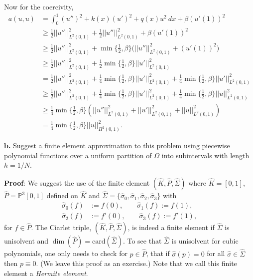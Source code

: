 \documentclass[11pt]{article}
\newcommand{\wh}{\widehat}
\begin{document}
Now for the coercivity, 
\begin{align*}
    a(u,u) &= \int_0^1 (u'')^2 + k(x) (u')^2 + q(x) u^2 \: dx + \beta (u'(1))^2 \\
    &\geq \tfrac{1}{2} ||u''||^2_{L^2(0,1)} + \tfrac{1}{2} ||u''||^2_{L^2(0,1)} + \beta (u'(1))^2 \\
    &\geq \tfrac{1}{2} ||u''||^2_{L^2(0,1)} + \min\big\{ \tfrac{1}{2}, \beta \big\} \big(||u''||^2_{L^2(0,1)} + (u'(1))^2\big) \\
    &\geq \frac{1}{2}||u''||^2_{L^2(0,1)} + \frac{1}{2}\min\Big\{\frac{1}{2}, \beta \Big\} ||u'||^2_{L^2(0,1)} \\
    &= \frac{1}{2}||u''||^2_{L^2(0,1)} + \frac{1}{4}\min\Big\{\frac{1}{2}, \beta \Big\} ||u'||^2_{L^2(0,1)} + \frac{1}{4}\min\Big\{\frac{1}{2}, \beta \Big\} ||u'||^2_{L^2(0,1)} \\
    &\geq \frac{1}{2}||u''||^2_{L^2(0,1)} + \frac{1}{4}\min\Big\{\frac{1}{2}, \beta \Big\} ||u'||^2_{L^2(0,1)} + \frac{1}{4}\min\Big\{\frac{1}{2}, \beta \Big\} ||u||^2_{L^2(0,1)} \\
    &\geq \frac{1}{4} \min \big\{\frac{1}{2}, \beta \big\} (||u''||^2_{L^2(0,1)} + ||u'||^2_{L^2(0,1)} + ||u||^2_{L^2(0,1)}) \\
    &= \frac{1}{4} \min \big\{\frac{1}{2}, \beta \big\} ||u||^2_{H^2(0,1)}.
\end{align*}



\vskip 2cm



{\bf b.} Suggest a finite element approximation to this problem using piecewise polynomial functions over a uniform partition of $\Omega$ into subintervals with length $h = 1/N$.

\vskip 1cm

{\bf Proof}: We suggest the use of the finite element $(\widehat{K}, \widehat{P}, \widehat{\Sigma})$ where $\widehat{K} = [0,1]$, $\widehat{P} = \mathbb{P}^3[0,1]$ defined on $\widehat{K}$ and $\widehat{\Sigma} = \{\wh{\sigma}_0, \wh{\sigma}_1, \wh{\sigma}_2, \wh{\sigma}_3 \}$ with
\begin{align*}
	\wh{\sigma}_0(f) &:= f(0), \qquad \wh{\sigma}_1(f) := f(1), \\
	\wh{\sigma}_2(f) &:= f'(0), \qquad \wh{\sigma}_3(f) := f'(1),
\end{align*}
for $f \in \widehat{P}$.
The Ciarlet triple, $(\widehat{K}, \widehat{P}, \widehat{\Sigma})$, is indeed a finite element if $\widehat{\Sigma}$ is unisolvent and $\dim(\widehat{P}) = \text{card}(\widehat{\Sigma})$. 
To see that $\widehat{\Sigma}$ is unisolvent for cubic polynomials, one only needs to check for $p\in\widehat{P}$, that if $\wh{\sigma}(p) = 0$ for all $\wh{\sigma} \in \widehat{\Sigma}$ then $p \equiv 0$.
(We leave this proof as an exercise.)
Note that we call this finite element a \textit{Hermite element}.
\end{document}
